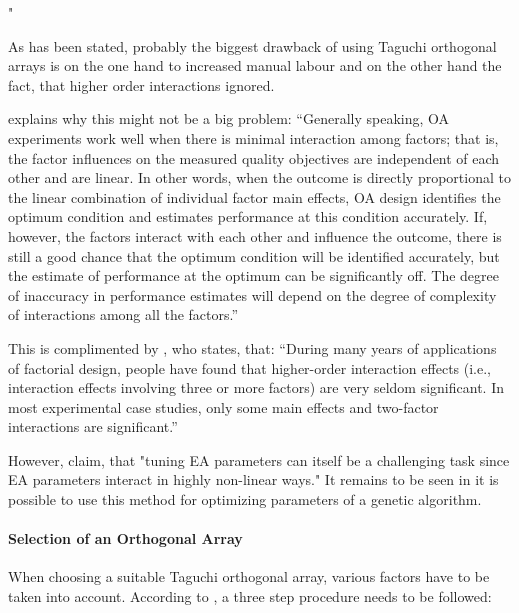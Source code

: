 "\cite{mills_determining_2015}

As has been stated, probably the biggest drawback of using Taguchi orthogonal arrays is on the one hand to increased manual labour and on the other hand the fact, that higher order interactions ignored.

\cite{roy_primer_1990} explains why this might not be a big problem:
\enquote{Generally speaking, OA experiments work well when there is minimal interaction among factors; that is, the factor influences on the measured quality objectives are independent of each other and are linear. In other words, when the outcome is directly proportional to the linear combination of individual factor main effects, OA design identifies the optimum condition and estimates performance at this condition accurately. If, however, the factors interact with each other and influence the outcome, there is still a good chance that the optimum condition will be identified accurately, but the estimate of performance at the optimum can be significantly off. The degree of inaccuracy in performance estimates will depend on the degree of complexity of interactions among all the factors.}

This is complimented by \cite{yang_design_2009}, who states, that:
\enquote{During many years of applications of factorial design, people have found that higher-order interaction effects (i.e., interaction effects involving three or more factors) are very seldom significant. In most experimental case studies, only some main effects and two-factor interactions are significant.}

However, \cite{kacprzyk_parameter_2007} claim, that "tuning EA parameters can itself be a challenging task since EA parameters interact in highly non-linear ways." It remains to be seen in it is possible to use this method for optimizing parameters of a genetic algorithm.
\fi

\paragraph{Selection of an Orthogonal Array}
When choosing a suitable Taguchi orthogonal array, various factors have to be taken into account. According to \cite{yang_design_2009}, a three step procedure needs to be followed:

